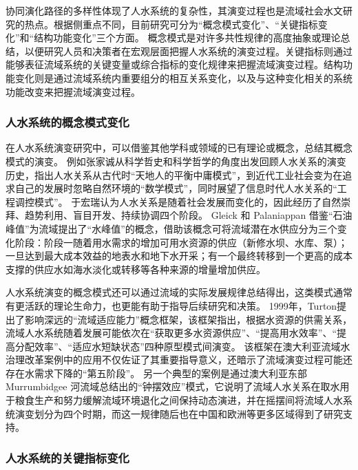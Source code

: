 协同演化路径的多样性体现了人\textendash{}水系统的复杂性，其演变过程也是流域社会\textendash{}水文研究的热点。根据侧重点不同，目前研究可分为“概念模式变化”、“关键指标变化”和“结构功能变化”三个方面。
概念模式是对许多共性规律的高度抽象或理论总结，以便研究人员和决策者在宏观层面把握人\textendash{}水系统的演变过程。关键指标则通过能够表征流域系统的关键变量或综合指标的变化规律来把握流域演变过程。结构功能变化则是通过流域系统内重要组分的相互关系变化，以及与这种变化相关的系统功能改变来把握流域演变过程。

\subsubsection{人\textendash{}水系统的概念模式变化}

在人\textendash{}水系统演变研究中，可以借鉴其他学科或领域的已有理论或概念，总结其概念模式的演变。
例如张家诚从科学哲史和科学哲学的角度出发回顾人\textendash{}水关系的演变历史，指出人\textendash{}水关系从古代时“天\textendash{}地\textendash{}人的平衡中庸模式”，到近代工业社会变为在追求自己的发展时忽略自然环境的“数学模式”，同时展望了信息时代人\textendash{}水关系的“工程调控模式”\cite{zhang2006}。
于宏瑞认为人\textendash{}水关系是随着社会发展而变化的，因此经历了自然崇拜、趋势利用、盲目开发、持续协调四个阶段\cite{yuruihong2011}。
Gleick 和 Palaniappan 借鉴“石油峰值”为流域提出了“水峰值”的概念，借助该概念可将流域潜在水供应分为三个变化阶段：阶段一随着用水需求的增加可用水资源的供应（新修水坝、水库、泵）；一旦达到最大成本效益的地表水和地下水开采；有一个最终转移到一个更高的成本支撑的供应水如海水淡化或转移等各种来源的增量增加供应\cite{gleick2010}。

人\textendash{}水系统演变的概念模式还可以通过流域的实际发展规律总结得出，这类模式通常有更活跃的理论生命力，也更能有助于指导后续研究和决策。
1999年，Turton提出了影响深远的“流域适应能力”概念框架，该框架指出，根据水资源的供需关系，流域人\textendash{}水系统随着发展可能依次在“获取更多水资源供应”、“提高用水效率”、“提高分配效率”、“适应水短缺状态”四种原型模式间演变\cite{turton1999}。
该框架在澳大利亚流域水治理改革案例中的应用不仅佐证了其重要指导意义，还暗示了流域演变过程可能还存在水需求下降的“第五阶段”\cite{loch2020}。
另一个典型的案例是通过澳大利亚东部 Murrumbidgee 河流域总结出的“钟摆效应”模式，它说明了流域人\textendash{}水关系在取水用于粮食生产和努力缓解流域环境退化之间保持动态演进，并在摇摆间将流域人\textendash{}水系统演变划分为四个时期\cite{kandasamy2014, roobavannan2017}，而这一规律随后也在中国和欧洲等更多区域得到了研究支持\cite{han2017, mostert2018}。

\subsubsection{人\textendash{}水系统的关键指标变化}

